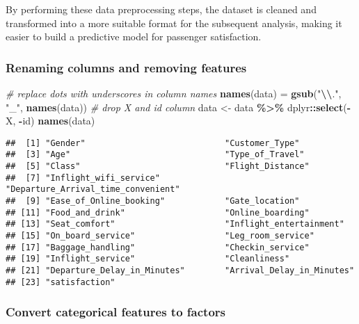 \documentclass[
]{article}
\newenvironment{Shaded}{\begin{snugshade}}{\end{snugshade}}
\newcommand{\CommentTok}[1]{\textcolor[rgb]{0.56,0.35,0.01}{\textit{#1}}}
\newcommand{\FunctionTok}[1]{\textcolor[rgb]{0.13,0.29,0.53}{\textbf{#1}}}
\newcommand{\NormalTok}[1]{#1}
\newcommand{\OtherTok}[1]{\textcolor[rgb]{0.56,0.35,0.01}{#1}}
\newcommand{\SpecialCharTok}[1]{\textcolor[rgb]{0.81,0.36,0.00}{\textbf{#1}}}
\newcommand{\StringTok}[1]{\textcolor[rgb]{0.31,0.60,0.02}{#1}}
\begin{document}
By performing these data preprocessing steps, the dataset is cleaned and
transformed into a more suitable format for the subsequent analysis,
making it easier to build a predictive model for passenger satisfaction.

\hypertarget{renaming-columns-and-removing-features}{%
\subsubsection{Renaming columns and removing
features}\label{renaming-columns-and-removing-features}}

\begin{Shaded}
\begin{Highlighting}[]
\CommentTok{\# replace dots with underscores in column names}
\FunctionTok{names}\NormalTok{(data) }\OtherTok{=} \FunctionTok{gsub}\NormalTok{(}\StringTok{"}\SpecialCharTok{\textbackslash{}\textbackslash{}}\StringTok{."}\NormalTok{, }\StringTok{"\_"}\NormalTok{, }\FunctionTok{names}\NormalTok{(data))}
\CommentTok{\# drop X and id column}
\NormalTok{data }\OtherTok{\textless{}{-}}\NormalTok{ data }\SpecialCharTok{\%\textgreater{}\%}\NormalTok{ dplyr}\SpecialCharTok{::}\FunctionTok{select}\NormalTok{(}\SpecialCharTok{{-}}\NormalTok{X, }\SpecialCharTok{{-}}\NormalTok{id)}
\FunctionTok{names}\NormalTok{(data)}
\end{Highlighting}
\end{Shaded}

\begin{verbatim}
##  [1] "Gender"                            "Customer_Type"                    
##  [3] "Age"                               "Type_of_Travel"                   
##  [5] "Class"                             "Flight_Distance"                  
##  [7] "Inflight_wifi_service"             "Departure_Arrival_time_convenient"
##  [9] "Ease_of_Online_booking"            "Gate_location"                    
## [11] "Food_and_drink"                    "Online_boarding"                  
## [13] "Seat_comfort"                      "Inflight_entertainment"           
## [15] "On_board_service"                  "Leg_room_service"                 
## [17] "Baggage_handling"                  "Checkin_service"                  
## [19] "Inflight_service"                  "Cleanliness"                      
## [21] "Departure_Delay_in_Minutes"        "Arrival_Delay_in_Minutes"         
## [23] "satisfaction"
\end{verbatim}

\hypertarget{convert-categorical-features-to-factors}{%
\subsubsection{Convert categorical features to
factors}\label{convert-categorical-features-to-factors}}
\end{document}
